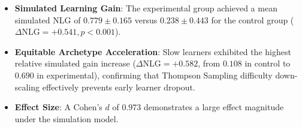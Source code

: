 \documentclass[journal]{IEEEtran}
\begin{document}
\begin{table}[!t]
\caption{Statistical Summary of Evaluation Outcomes ($N=60$)}
\label{table_results}
\centering
\small
{}
\end{table}

\begin{itemize}
    \item \textbf{Simulated Learning Gain}: The experimental group achieved a mean simulated NLG of $0.779 \pm 0.165$ versus $0.238 \pm 0.443$ for the control group ($\Delta \text{NLG} = +0.541, p < 0.001$).
    \item \textbf{Equitable Archetype Acceleration}: Slow learners exhibited the highest relative simulated gain increase ($\Delta \text{NLG} = +0.582$, from $0.108$ in control to $0.690$ in experimental), confirming that Thompson Sampling difficulty down-scaling effectively prevents early learner dropout.
    \item \textbf{Effect Size}: A Cohen's $d$ of $0.973$ demonstrates a large effect magnitude under the simulation model.
\end{itemize}
\end{document}
